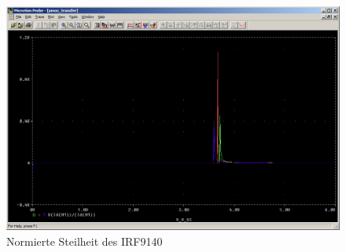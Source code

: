 \begin{figure}%
	\centering
	\includegraphics[width=\textwidth]{fig/ue2_ex3_pmos_s_norm.PNG}
	\caption{Normierte Steilheit des IRF9140}
	\label{fig:3_pmos_s_norm}
\end{figure}

